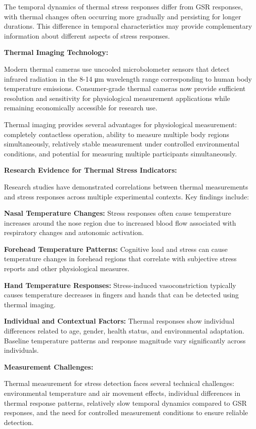 \documentclass[12pt,a4paper]{report}
\begin{document}
The temporal dynamics of thermal stress responses differ from GSR responses, with thermal changes often occurring more
gradually and persisting for longer durations. This difference in temporal characteristics may provide complementary
information about different aspects of stress responses.

\textbf{Thermal Imaging Technology:}

Modern thermal cameras use uncooled microbolometer sensors that detect infrared radiation in the 8-14 μm wavelength
range corresponding to human body temperature emissions. Consumer-grade thermal cameras now provide sufficient
resolution and sensitivity for physiological measurement applications while remaining economically accessible for
research use.

Thermal imaging provides several advantages for physiological measurement: completely contactless operation, ability to
measure multiple body regions simultaneously, relatively stable measurement under controlled environmental conditions,
and potential for measuring multiple participants simultaneously.

\textbf{Research Evidence for Thermal Stress Indicators:}

Research studies have demonstrated correlations between thermal measurements and stress responses across multiple
experimental contexts. Key findings include:

\textbf{Nasal Temperature Changes:} Stress responses often cause temperature increases around the nose region due to
increased blood flow associated with respiratory changes and autonomic activation.

\textbf{Forehead Temperature Patterns:} Cognitive load and stress can cause temperature changes in forehead regions that
correlate with subjective stress reports and other physiological measures.

\textbf{Hand Temperature Responses:} Stress-induced vasoconstriction typically causes temperature decreases in fingers and
hands that can be detected using thermal imaging.

\textbf{Individual and Contextual Factors:} Thermal responses show individual differences related to age, gender, health
status, and environmental adaptation. Baseline temperature patterns and response magnitude vary significantly across
individuals.

\textbf{Measurement Challenges:}

Thermal measurement for stress detection faces several technical challenges: environmental temperature and air movement
effects, individual differences in thermal response patterns, relatively slow temporal dynamics compared to GSR
responses, and the need for controlled measurement conditions to ensure reliable detection.
\end{document}
